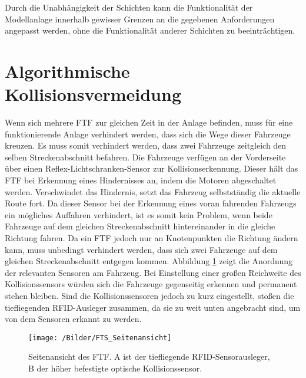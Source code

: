 		Durch die Unabhängigkeit der Schichten kann die Funktionalität der Modellanlage innerhalb gewisser Grenzen an die gegebenen Anforderungen angepasst werden, ohne die Funktionalität anderer Schichten zu beeinträchtigen.

\section{Algorithmische Kollisionsvermeidung}
	\label{Kollisionsvermeidung}
		
	Wenn sich mehrere \ac{FTF} zur gleichen Zeit in der Anlage befinden, muss für eine funktionierende Anlage verhindert werden, dass sich die Wege dieser Fahrzeuge kreuzen. Es muss somit verhindert werden, dass zwei Fahrzeuge zeitgleich den selben Streckenabschnitt befahren.  Die Fahrzeuge verfügen an der Vorderseite über einen Reflex-Lichtschranken-Sensor zur Kollisionserkennung. Dieser hält das \ac{FTF} bei Erkennung eines Hindernisses an, indem die Motoren abgeschaltet werden. Verschwindet das Hindernis, setzt das Fahrzeug selbstständig die aktuelle Route fort. Da dieser Sensor bei der Erkennung eines voran fahrenden Fahrzeugs ein mögliches Auffahren verhindert, ist es somit kein Problem, wenn beide Fahrzeuge auf dem gleichen Streckenabschnitt hintereinander in die gleiche Richtung fahren. Da ein \ac{FTF} jedoch nur an Knotenpunkten die Richtung ändern kann, muss unbedingt verhindert werden, dass sich zwei Fahrzeuge auf dem gleichen Streckenabschnitt entgegen kommen. Abbildung \ref{FTS Seite Sensoren} zeigt die Anordnung der relevanten Sensoren am Fahrzeug. Bei Einstellung einer großen Reichweite des Kollisionssensors  würden sich die Fahrzeuge gegenseitig erkennen und permanent stehen bleiben. Sind die Kollisionssensoren jedoch zu kurz eingestellt, stoßen die tiefliegenden \ac{RFID}-Ausleger zusammen, da sie zu weit unten angebracht sind, um von dem Sensoren erkannt zu werden. 
	
	\begin{figure}
		\centering
		\texttt{[image: /Bilder/FTS\_Seitenansicht]}
		\vspace{0.2cm}
		\caption{Seitenansicht des \ac{FTF}. A ist der tiefliegende \ac{RFID}-Sensorausleger, B der höher befestigte optische Kollisionssensor.} \label{FTS Seite Sensoren}
	\end{figure}
	
